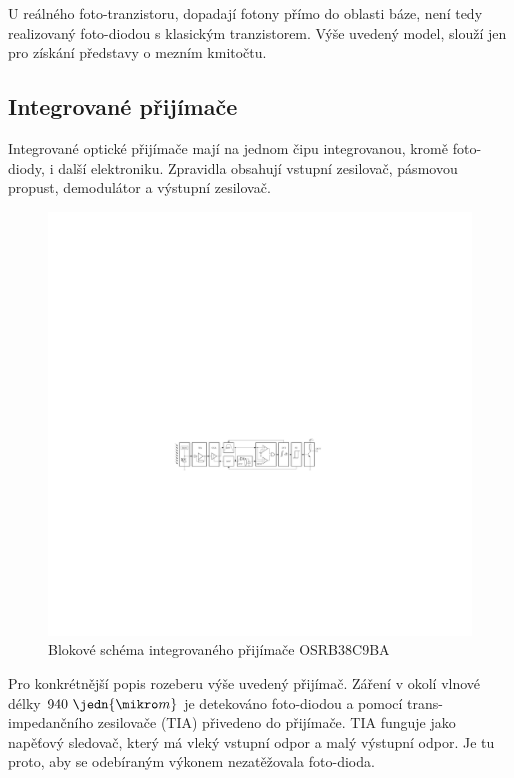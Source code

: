 U reálného foto-tranzistoru, dopadají fotony přímo do oblasti báze, není tedy realizovaný foto-diodou s klasickým tranzistorem. Výše uvedený model, slouží jen pro získání představy o mezním kmitočtu.

\subsection{Integrované přijímače}
Integrované optické přijímače mají na jednom čipu integrovanou, kromě foto-diody, i další elektroniku. Zpravidla obsahují vstupní zesilovač, pásmovou propust, demodulátor a výstupní zesilovač.

\begin{figure}[H]
    \begin{center}
        \includegraphics[width=\textwidth]{img/ir-rx}
    \end{center}
    \caption{Blokové schéma integrovaného přijímače OSRB38C9BA}
\end{figure}

Pro konkrétnější popis rozeberu výše uvedený přijímač. Záření v okolí vlnové délky $940~\jedn{\mikro m}$ je detekováno foto-diodou a pomocí trans-impedančního zesilovače (TIA) přivedeno do přijímače. TIA funguje jako napěťový sledovač, který má vleký vstupní odpor a malý výstupní odpor. Je tu proto, aby se odebíraným výkonem nezatěžovala foto-dioda.

